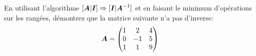 \begin{TwoCol}
   \begin{exercice}
   En utilisant l'algorithme $[\boldsymbol{A}|\boldsymbol{I}] \Rightarrow [\boldsymbol{I} | \boldsymbol{A}^{-1}]$ 
   et en faisant le minimum d'opérations sur les rangées, démontrez que 
   la matrice suivante n'a pas d'inverse:
   \[
   \boldsymbol{A} = \begin{pmatrix}
   1 & 2 & 4 \\
   0 & -1 & 5 \\
   1 & 1 & 9
   \end{pmatrix}
   \]
   \end{exercice}
 \end{TwoCol}